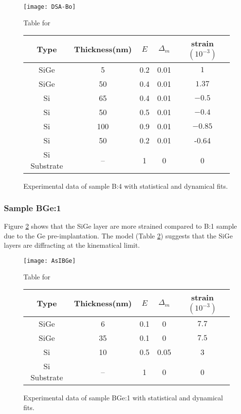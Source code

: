 \begin{figure}[ht]
\caption{Experimental data of sample B:4 with statistical and dynamical fits.}
\label{B4:fig}
\begin{minipage}{\linewidth}
\texttt{[image: DSA-Bo]}
\end{minipage}
\begin{minipage}{\linewidth}
\vspace{10pt}
\centering
Table for \\
\begin{tabular}[htbp]{@{}c|cccc@{}}
    \hline
  Type & Thickness(nm) & $E$ & $\Delta_m$ & strain $(10^{-3})$ \\
    \hline
  SiGe & 5 & 0.2 & 0.01 & $1 $  \\
  SiGe & 50 & 0.4 & 0.01 & $1.37 $  \\
  Si   & 65 & 0.4 & 0.01 & $-0.5$ \\
  Si 	 & 50 & 0.5 & 0.01 & $-0.4$\\
  Si & 100  & 0.9 & 0.01 & $-0.85$\\
  Si & 50 & 0.2 & 0.01 & -0.64\\
  Si Substrate & -- & 1 & 0 & 0 
  \end{tabular}
\end{minipage}
\end{figure}

\subsubsection{Sample BGe:1}

Figure \ref{BGe1:fig} shows that the SiGe layer are more strained compared to B:1 sample due to the Ge pre-implantation.  The model (Table \ref{BGe1:fig}) suggests that the SiGe layers are diffracting at the kinematical limit.

\begin{figure}[ht]%
\caption{Experimental data of sample BGe:1 with statistical and dynamical fits.}
\label{BGe1:fig}
\begin{minipage}{\linewidth}
\texttt{[image: AsIBGe]}
\end{minipage}
\begin{minipage}{\linewidth}
\centering
\vspace{10pt}
Table for \\
\begin{tabular}[htbp]{@{}c|cccc@{}}
    \hline
  Type & Thickness(nm) & $E$ & $\Delta_m$ & strain $(10^{-3})$ \\
    \hline
  SiGe & 6 & 0.1 & 0 & $7.7 $  \\
  SiGe & 35 & 0.1 & 0 & $7.5 $  \\
  Si & 10 & 0.5 & 0.05 & 3\\
    Si Substrate & -- & 1 & 0 & 0 
  \end{tabular}
\end{minipage}
\end{figure}

